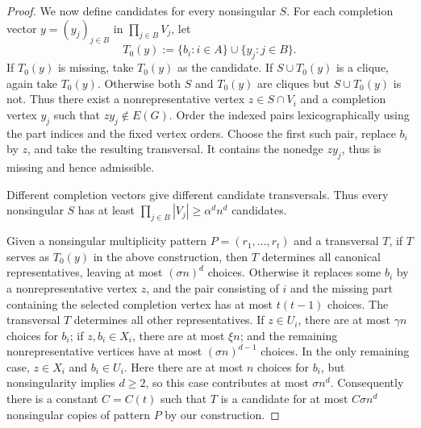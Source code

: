 \documentclass[11pt]{article}
\numberwithin{equation}{section}
\theoremstyle{remark}
\begin{document}
\begin{proof}
We now define candidates for every nonsingular \(S\). For each completion vector \(y=(y_j)_{j\in B}\) in \(\prod_{j\in B}V_j\), let
\begin{equation*}
T_0(y):=\{b_i:i\in A\}\cup\{y_j:j\in B\}.
\end{equation*}
If \(T_0(y)\) is missing, take \(T_0(y)\) as the candidate. If \(S\cup T_0(y)\) is a clique,
again take \(T_0(y)\). Otherwise both \(S\) and \(T_0(y)\) are cliques but \(S\cup T_0(y)\) is not.
Thus there exist a nonrepresentative vertex \(z\in S\cap V_i\) and a completion vertex \(y_j\) such
that \(zy_j\notin E(G)\). Order the indexed pairs lexicographically using the part indices and the
fixed vertex orders. Choose the first such pair, replace \(b_i\) by \(z\), and take the resulting transversal.
It contains the nonedge \(zy_j\), thus is missing and hence admissible.

Different completion vectors give different candidate transversals.
Thus every nonsingular \(S\) has at least \(\prod_{j\in B}|V_j|\ge \alpha^d n^d\) candidates.

Given a nonsingular multiplicity pattern \(P=(r_1,\ldots,r_t)\) and a transversal \(T\),
if \(T\) serves as \(T_0(y)\) in the above construction,
then \(T\) determines all canonical representatives, leaving at most \((\sigma n)^d\) choices.
Otherwise it replaces some \(b_i\) by a nonrepresentative vertex \(z\), and the pair consisting
of \(i\) and the missing part containing the selected completion vertex has at most \(t(t-1)\) choices.
The transversal \(T\) determines all other representatives.
If \(z\in U_i\), there are at most \(\gamma n\) choices for \(b_i\); if \(z,b_i\in X_i\), there are
at most \(\xi n\); and the remaining nonrepresentative vertices have at most \((\sigma n)^{d-1}\) choices.
In the only remaining case, \(z\in X_i\) and \(b_i\in U_i\). Here there are at most \(n\) choices for \(b_i\),
but nonsingularity implies \(d\ge2\), so this case contributes at most \(\sigma n^d\).
Consequently there is a constant \(C=C(t)\) such that \(T\) is a candidate for at most \(C\sigma n^d\)
nonsingular copies of pattern \(P\) by our construction.


\end{proof}
\end{document}
